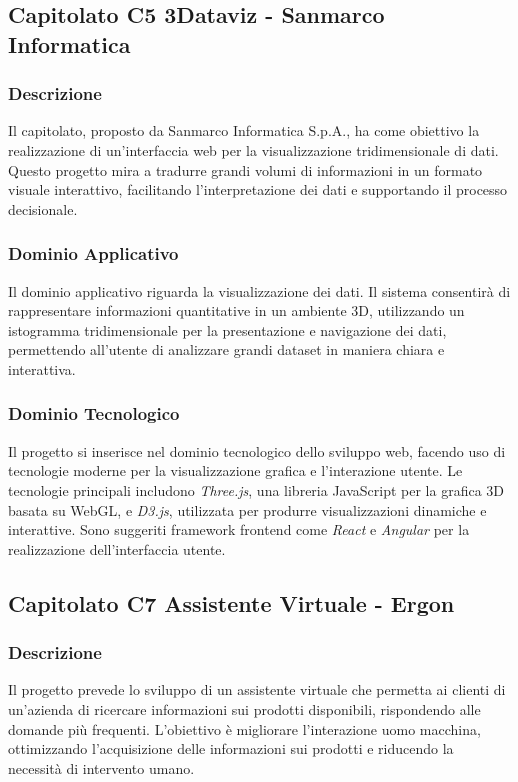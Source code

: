 \documentclass{article}
\begin{document}
\subsection{Capitolato C5 3Dataviz - Sanmarco Informatica}

\subsubsection{Descrizione}
Il capitolato, proposto da Sanmarco Informatica S.p.A., 
ha come obiettivo la realizzazione di un'interfaccia web 
per la visualizzazione tridimensionale di dati.
Questo progetto mira a tradurre grandi volumi di informazioni in un formato visuale interattivo, 
facilitando l'interpretazione dei dati e supportando il processo decisionale.

\subsubsection{Dominio Applicativo}
Il dominio applicativo riguarda la visualizzazione dei dati. 
Il sistema consentirà di rappresentare informazioni quantitative in un ambiente 3D, 
utilizzando un istogramma tridimensionale per la presentazione e navigazione dei dati, 
permettendo all'utente di analizzare grandi dataset in maniera chiara e interattiva.

\subsubsection{Dominio Tecnologico}
Il progetto si inserisce nel dominio tecnologico dello sviluppo web, 
facendo uso di tecnologie moderne per la visualizzazione grafica e l'interazione utente. 
Le tecnologie principali includono \textit{Three.js}, una libreria JavaScript per 
la grafica 3D basata su WebGL, e \textit{D3.js}, utilizzata per produrre visualizzazioni 
dinamiche e interattive. Sono suggeriti framework frontend come \textit{React} e \textit{Angular} 
per la realizzazione dell'interfaccia utente.

\subsection{Capitolato C7 Assistente Virtuale - Ergon}

\subsubsection{Descrizione}
Il progetto prevede lo sviluppo di un assistente virtuale che permetta ai clienti 
di un'azienda di ricercare informazioni sui prodotti disponibili, 
rispondendo alle domande più frequenti. L'obiettivo è migliorare l'interazione uomo macchina, 
ottimizzando l'acquisizione delle informazioni sui prodotti e riducendo la necessità di intervento umano.
\end{document}
